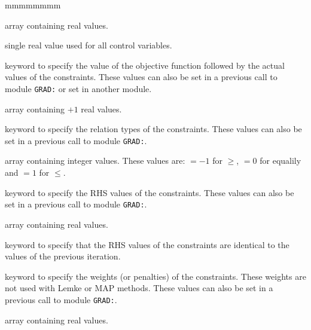 \begin{ListeDeDescription}{mmmmmmmm}
\item[\dusa{vecmax}] array containing  real values.

\item[\dusa{varmax}] single real value used for all control variables.

\item[\moc{FOBJ-CST-VAL}] keyword to specify the value of the objective function followed by the actual values of the constraints. These values can also be set in a previous call
to module {\tt GRAD:} or set in another module.

\item[\dusa{funct}] array containing $+1$ real values.

\item[\moc{CST-TYPE}] keyword to specify the relation types of the constraints. These values can also be set in a previous call
to module {\tt GRAD:}.

\item[\dusa{type}] array containing  integer values. These values are: $=-1$ for $\ge$, $=0$ for equalily and $=1$
for $\le$.

\item[\moc{CST-OBJ}] keyword to specify the RHS values of the constraints. These values can also be set in a previous call
to module {\tt GRAD:}.

\item[\dusa{cstval}] array containing  real values.

\item[\moc{KEEP}] keyword to specify that the RHS values of the constraints are identical to the values of the previous iteration.

\item[\moc{CST-WEIGHT}] keyword to specify the weights (or penalties) of the constraints. These weights are not used with
Lemke or MAP methods. These values can also be set in a previous call to module {\tt GRAD:}.

\item[\dusa{cstw}] array containing  real values.

\end{ListeDeDescription}
\clearpage

